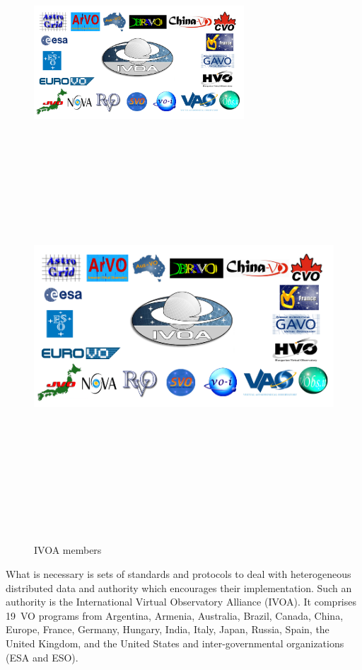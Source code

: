    \begin{figure}
     \vspace{0pt}
     \begin{center}
       \ifpdf
       \includegraphics[width=0.7\textwidth]{ivoamembers}
       \else
       \includegraphics[bb = 92 86 545 742, height=6in]{ivoamembers.jpg}
       \fi
     \end{center}
     \vspace{-20pt}
     \caption{IVOA members}
     \vspace{-10pt}
   \end{figure}


   What is necessary is sets of standards and protocols to deal with
   heterogeneous distributed data and authority which encourages their
   implementation. Such an authority is the International Virtual
   Observatory Alliance (IVOA). It comprises 19~VO programs from
   Argentina, Armenia, Australia, Brazil, Canada, China, Europe,
   France, Germany, Hungary, India, Italy, Japan, Russia, Spain, the
   United Kingdom, and the United States and inter-governmental
   organizations (ESA and ESO)\cite{hanisch2010international}.
   
